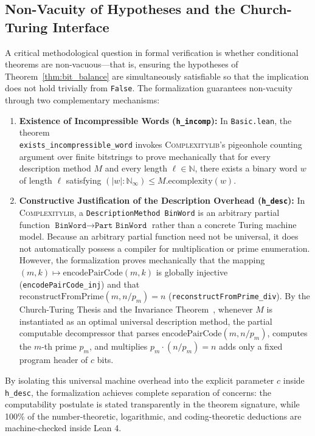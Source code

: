 \documentclass[acmsmall,natbib=false,nonacm]{acmart}
\begin{document}
\subsection{Non-Vacuity of Hypotheses and the Church-Turing Interface}
A critical methodological question in formal verification is whether conditional theorems are non-vacuous—that is, ensuring the hypotheses of Theorem~\ref{thm:bit_balance} are simultaneously satisfiable so that the implication does not hold trivially from \texttt{False}. The formalization guarantees non-vacuity through two complementary mechanisms:
\begin{enumerate}
    \item \textbf{Existence of Incompressible Words (\texttt{h\_incomp}):} In \texttt{Basic.lean}, the theorem \\ \texttt{exists\_incompressible\_word} invokes \textsc{Complexitylib}'s pigeonhole counting argument over finite bitstrings to prove mechanically that for every description method $M$ and every length $\ell \in \mathbb{N}$, there exists a binary word $w$ of length $\ell$ satisfying $(|w| : \mathbb{N}_\infty) \le M.\text{ecomplexity}(w)$.
    \item \textbf{Constructive Justification of the Description Overhead (\texttt{h\_desc}):} In \textsc{Complexitylib}, a \texttt{DescriptionMethod BinWord} is an arbitrary partial function $\texttt{BinWord} \to \texttt{Part BinWord}$ rather than a concrete Turing machine model. Because an arbitrary partial function need not be universal, it does not automatically possess a compiler for multiplication or prime enumeration. However, the formalization proves mechanically that the mapping $(m, k) \mapsto \text{encodePairCode}(m, k)$ is globally injective (\texttt{encodePairCode\_inj}) and that \\ $\text{reconstructFromPrime}(m, n / p_m) = n$ (\texttt{reconstructFromPrime\_div}). By the Church-Turing Thesis and the Invariance Theorem~\cite{li2019introduction}, whenever $M$ is instantiated as an optimal universal description method, the partial computable decompressor that parses $\text{encodePairCode}(m, n / p_m)$, computes the $m$-th prime $p_m$, and multiplies $p_m \cdot (n / p_m) = n$ adds only a fixed program header of $c$ bits.
\end{enumerate}

By isolating this universal machine overhead into the explicit parameter $c$ inside \texttt{h\_desc}, the formalization achieves complete separation of concerns: the computability postulate is stated transparently in the theorem signature, while 100\% of the number-theoretic, logarithmic, and coding-theoretic deductions are machine-checked inside Lean 4.
\end{document}
